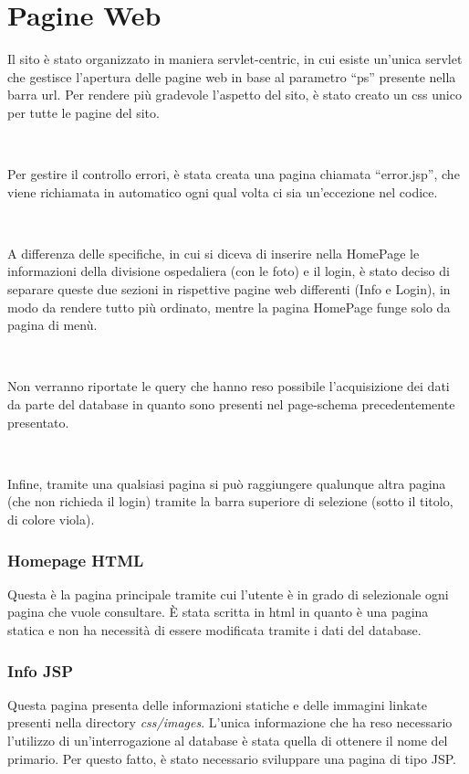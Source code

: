 \documentclass[a4paper,titlepage]{article}
\begin{document}
\part{Pagine Web}

Il sito è stato organizzato in maniera servlet-centric, in cui esiste un'unica servlet che gestisce l'apertura delle pagine web in base al parametro ``ps'' presente nella barra url. Per rendere più gradevole l'aspetto del sito, è stato creato un css unico per tutte le pagine del sito.

~

Per gestire il controllo errori, è stata creata una pagina chiamata ``error.jsp'', che viene richiamata in automatico ogni qual volta ci sia un'eccezione nel codice.

~

A differenza delle specifiche, in cui si diceva di inserire nella HomePage le informazioni della divisione ospedaliera (con le foto) e il login, è stato deciso di separare queste due sezioni in rispettive pagine web differenti (Info e Login), in modo da rendere tutto più ordinato, mentre la pagina HomePage funge solo da pagina di menù.

~

Non verranno riportate le query che hanno reso possibile l'acquisizione dei dati da parte del database in quanto sono presenti nel page-schema precedentemente presentato.

~

Infine, tramite una qualsiasi pagina si può raggiungere qualunque altra pagina (che non richieda il login) tramite la barra superiore di selezione (sotto il titolo, di colore viola).

\section{Homepage HTML}

Questa è la pagina principale tramite cui l'utente è in grado di selezionale ogni pagina che vuole consultare. È stata scritta in html in quanto è una pagina statica e non ha necessità di essere modificata tramite i dati del database.

\section{Info JSP}

Questa pagina presenta delle informazioni statiche e delle immagini linkate presenti nella directory \textit{css/images}. L'unica informazione che ha reso necessario l'utilizzo di un'interrogazione al database è stata quella di ottenere il nome del primario. Per questo fatto, è stato necessario sviluppare una pagina di tipo JSP.
\end{document}
